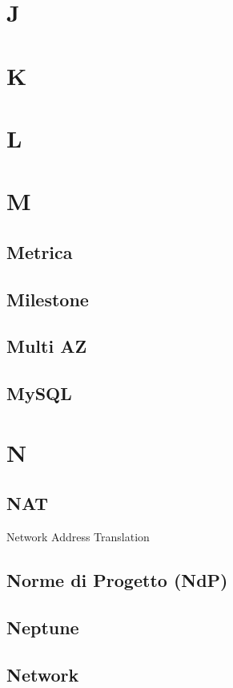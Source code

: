 \documentclass{classes/base}
\begin{document}
    \section*{J}
    \newpage  
    \section*{K}
    \newpage  
    \section*{L}
    \newpage  
    \section*{M} 
        \subsection*{Metrica}

        \subsection*{Milestone}

        \subsection*{Multi AZ} 

        \subsection*{MySQL}
        \newpage  
    \section*{N}
        \subsection*{NAT}
        Network Address Translation

        \subsection*{Norme di Progetto (NdP)} 

        \subsection*{Neptune}

        \subsection*{Network}
\end{document}
